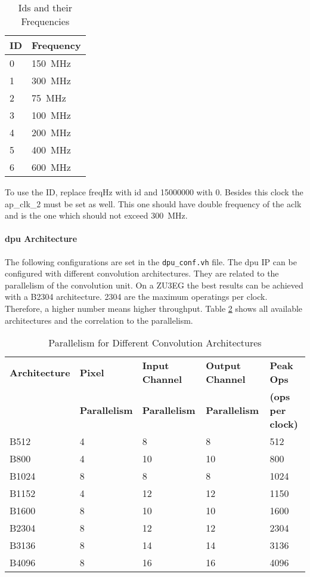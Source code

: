 \begin{table}[hb]
  \caption{Ids and their Frequencies}
  \label{tab:frequencies_ids}
  \centering
  \begin{tabular}{ll}
    \toprule
    \textbf{ID} & \textbf{Frequency} \\
    \midrule
    0 & \SI{150}{MHz} \\
    1 & \SI{300}{MHz} \\
    2 & \SI{75}{MHz} \\
    3 & \SI{100}{MHz} \\
    4 & \SI{200}{MHz} \\
    5 & \SI{400}{MHz} \\
    6 & \SI{600}{MHz} \\
    \bottomrule
  \end{tabular}
\end{table}

To use the ID, replace freqHz with id and 15000000 with 0.
Besides this clock the ap\_clk\_2 must be set as well.
This one should have double frequency of the aclk and is the one which should not exceed \SI{300}{MHz}.

\paragraph{\acrshort{dpu} Architecture}
The following configurations are set in the \texttt{dpu\_conf.vh} file.
The \acrshort{dpu} IP can be configured with different convolution architectures.
They are related to the parallelism of the convolution unit.
On a ZU3EG the best results can be achieved with a B2304 architecture.
2304 are the maximum operatings per clock.
Therefore, a higher number means higher throughput.
Table \ref{tab:arch_parallelism} shows all available architectures and the correlation to the parallelism.

\begin{table}[hb]
  \caption{Parallelism for Different Convolution Architectures \cite{dpu_product_guide}}
  \label{tab:arch_parallelism}
  \centering
  \begin{tabular}{lllll}
    \toprule
    \textbf{Architecture} & \textbf{Pixel} & \textbf{Input Channel} & \textbf{Output Channel} & \textbf{Peak Ops} \\
     & \textbf{Parallelism} & \textbf{Parallelism} & \textbf{Parallelism} & \textbf{(ops per clock)} \\
    \midrule
    B512 & 4 & 8 & 8 & 512 \\
    B800 & 4 & 10 & 10 & 800 \\
    B1024 & 8 & 8 & 8 & 1024 \\
    B1152 & 4 & 12 & 12 & 1150 \\
    B1600 & 8 & 10 & 10 & 1600 \\
    B2304 & 8 & 12 & 12 & 2304 \\
    B3136 & 8 & 14 & 14 & 3136 \\
    B4096 & 8 & 16 & 16 & 4096 \\
    \bottomrule
  \end{tabular}
\end{table}

